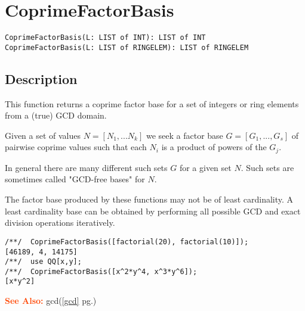 \documentclass[a4paper]{mybook}
\newenvironment{command}{}{} %
\newcommand\SeeAlso{\par\textcolor{OrangeRed}{\textbf{\large See Also: }}}
\begin{document}
\section{CoprimeFactorBasis}
\label{CoprimeFactorBasis}
\begin{command} %


\begin{Verbatim}[label=syntax, rulecolor=\color{MidnightBlue},
frame=single]
CoprimeFactorBasis(L: LIST of INT): LIST of INT
CoprimeFactorBasis(L: LIST of RINGELEM): LIST of RINGELEM
\end{Verbatim}


\subsection*{Description}

This function returns a coprime factor base for a set of integers
or ring elements from a (true) GCD domain.
\par 
Given a set of values $N = [ N_1,...N_k ]$ we seek a factor base
$G = [ G_1,...,G_s ]$ of pairwise coprime values such that each
$N_i$ is a product of powers of the $G_j$.
\par 
In general there are many different such sets $G$ for a given set $N$.
Such sets are sometimes called "GCD-free bases" for $N$.
\par 
The factor base produced by these functions may not be of least cardinality.
A least cardinality base can be obtained by performing all possible GCD and
exact division operations iteratively.
\begin{Verbatim}[label=example, rulecolor=\color{PineGreen}, frame=single]
/**/  CoprimeFactorBasis([factorial(20), factorial(10)]);
[46189, 4, 14175]
/**/  use QQ[x,y];
/**/  CoprimeFactorBasis([x^2*y^4, x^3*y^6]);
[x*y^2]
\end{Verbatim}


\SeeAlso %
  gcd(\ref{gcd} pg.\pageref{gcd})
\end{command} %
\end{document}
